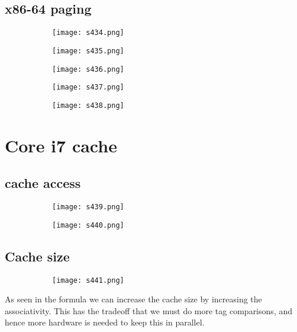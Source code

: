 \documentclass[8pt]{extreport}
\begin{document}
\subsection{x86-64 paging}
\begin{figure}[H]
\begin{subfigure}[b]{0.4\linewidth}
\texttt{[image: s434.png]}
\end{subfigure}
\begin{subfigure}[b]{0.4\linewidth}
\texttt{[image: s435.png]}
\end{subfigure}
\begin{subfigure}[b]{0.4\linewidth}
\texttt{[image: s436.png]}
\end{subfigure}
\begin{subfigure}[b]{0.4\linewidth}
\texttt{[image: s437.png]}
\end{subfigure}
\begin{subfigure}[b]{0.4\linewidth}
\texttt{[image: s438.png]}
\end{subfigure}
\end{figure}

\section{Core i7 cache}

\subsection{cache access}
\begin{figure}[H]
\begin{subfigure}[b]{0.4\linewidth}
\texttt{[image: s439.png]}
\end{subfigure}
\begin{subfigure}[b]{0.4\linewidth}
\texttt{[image: s440.png]}
\end{subfigure}
\end{figure}

\subsection{Cache size}

\begin{figure}[H]
\begin{subfigure}[b]{0.4\linewidth}
\texttt{[image: s441.png]}
\end{subfigure}
\end{figure}
As seen in the formula we can increase the cache size by increasing the associativity. This has the tradeoff that we must do more tag comparisons, and hence more hardware is needed to keep this in parallel.
\end{document}
